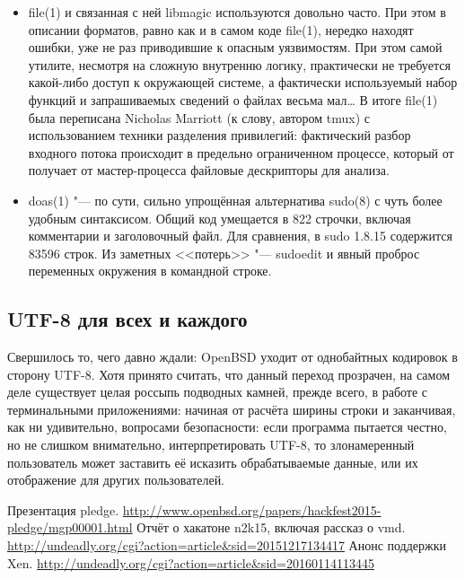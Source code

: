 \documentclass[10pt, a5paper]{article}
\begin{document}
\begin{itemize}
  \item file(1) и связанная с ней libmagic используются довольно часто. При этом в описании форматов, равно как и в самом коде file(1), нередко находят ошибки, уже не раз приводившие к опасным уязвимостям. При этом самой утилите, несмотря на сложную внутренню логику, практически не требуется какой-либо доступ к окружающей системе, а фактически используемый набор функций и запрашиваемых сведений о файлах весьма мал\ldots{} В итоге file(1) была переписана Nicholas Marriott (к слову, автором tmux) с использованием техники разделения привилегий: фактический разбор входного потока происходит в предельно ограниченном процессе, который от получает от мастер-процесса файловые дескрипторы для анализа.

  \item doas(1) "--- по сути, сильно упрощённая альтернатива sudo(8) с чуть более удобным синтаксисом. Общий код умещается в 822 строчки, включая комментарии и заголовочный файл. Для сравнения, в sudo 1.8.15 содержится 83596 строк. Из заметных <<потерь>> "--- sudoedit и явный проброс переменных окружения в командной строке.
\end{itemize}

\subsection*{UTF-8 для всех и каждого}

Свершилось то, чего давно ждали: OpenBSD уходит от однобайтных кодировок в сторону UTF-8. Хотя принято считать, что данный переход прозрачен, на самом деле существует целая россыпь подводных камней, прежде всего, в работе с терминальными приложениями: начиная от расчёта ширины строки и заканчивая, как ни удивительно, вопросами безопасности: если программа пытается честно, но не слишком внимательно, интерпретировать UTF-8, то злонамеренный пользователь может заставить её исказить обрабатываемые данные, или их отображение для других пользователей.

\begin{thebibliography}{99}
   Презентация pledge. \url{http://www.openbsd.org/papers/hackfest2015-pledge/mgp00001.html}{}
   Отчёт о хакатоне n2k15, включая рассказ о vmd. \url{http://undeadly.org/cgi?action=article&sid=20151217134417}{}
   Анонс поддержки Xen. \url{http://undeadly.org/cgi?action=article&sid=20160114113445}{}
\end{thebibliography}
\end{document}
